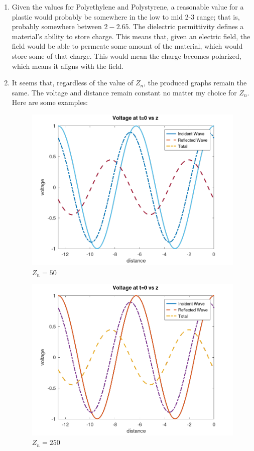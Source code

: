 \begin{enumerate}

  \item Given the values for Polyethylene and Polystyrene, a reasonable value for a plastic would probably be somewhere in the low to mid 2-3 range; that is, probably somewhere between $2-2.65$. The dielectric permittivity defines a material's ability to store charge. This means that, given an electric field, the field would be able to permeate some amount of the material, which would store some of that charge. This would mean the charge becomes polarized, which means it aligns with the field.

  \item It seems that, regardless of the value of $Z_n$, the produced graphs remain the same. The voltage and distance remain constant no matter my choice for $Z_n$. Here are some examples:

    \begin{multicols}{2}

      \begin{figure}[H]
        \centering
        \includegraphics[width=.5\textwidth]{Figures/Lab Two/Zn50.png}
        \caption{$Z_n=50$}
        \label{fig:1}
      \end{figure}

      \begin{figure}[H]
        \centering
        \includegraphics[width=.5\textwidth]{Figures/Lab Two/Zn250.png}
        \caption{$Z_n=250$}
        \label{fig:2}
      \end{figure}


\end{multicols}
\end{enumerate}
